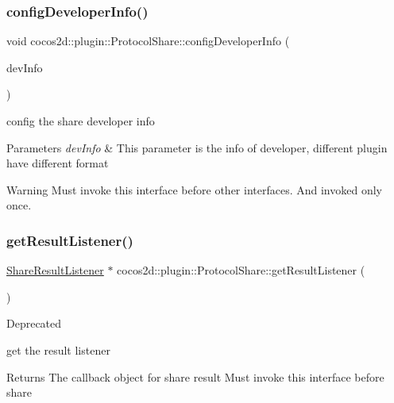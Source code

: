 \subsubsection{\texorpdfstring{config\+Developer\+Info()}{configDeveloperInfo()}}
{\footnotesize\ttfamily void cocos2d\+::plugin\+::\+Protocol\+Share\+::config\+Developer\+Info (\begin{DoxyParamCaption}\item[{T\+Share\+Developer\+Info}]{dev\+Info }\end{DoxyParamCaption})}



config the share developer info 


\begin{DoxyParams}{Parameters}
{\em dev\+Info} & This parameter is the info of developer, different plugin have different format \\
\hline
\end{DoxyParams}
\begin{DoxyWarning}{Warning}
Must invoke this interface before other interfaces. And invoked only once. 
\end{DoxyWarning}
\mbox{\label{classcocos2d_1_1plugin_1_1ProtocolShare_a83af809aea16835dffb1de25576b01ac}} 
\subsubsection{\texorpdfstring{get\+Result\+Listener()}{getResultListener()}}
{\footnotesize\ttfamily \hyperlink{classcocos2d_1_1plugin_1_1ShareResultListener}{Share\+Result\+Listener} $\ast$ cocos2d\+::plugin\+::\+Protocol\+Share\+::get\+Result\+Listener (\begin{DoxyParamCaption}{ }\end{DoxyParamCaption})}

\begin{DoxyRefDesc}{Deprecated}
\item[\hyperlink{deprecated__deprecated000235}{Deprecated}]get the result listener \end{DoxyRefDesc}
\begin{DoxyReturn}{Returns}
The callback object for share result  Must invoke this interface before share 
\end{DoxyReturn}
\mbox{\label{classcocos2d_1_1plugin_1_1ProtocolShare_a1dbb7ad2d96a9c5f222ad992e664f71b}} 
